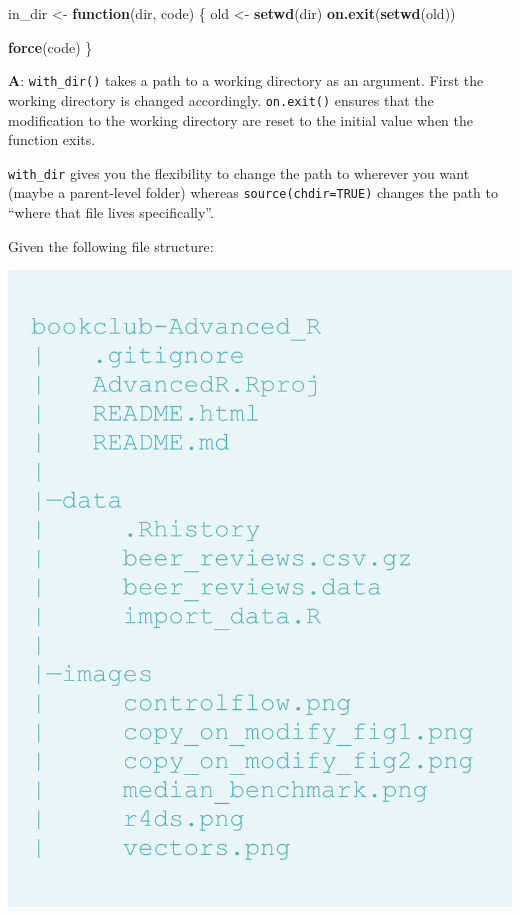 \documentclass[]{book}
\newenvironment{Shaded}{\begin{snugshade}}{\end{snugshade}}
\newcommand{\ControlFlowTok}[1]{\textcolor[rgb]{0.13,0.29,0.53}{\textbf{#1}}}
\newcommand{\KeywordTok}[1]{\textcolor[rgb]{0.13,0.29,0.53}{\textbf{#1}}}
\newcommand{\NormalTok}[1]{#1}
\newcommand{\StringTok}[1]{\textcolor[rgb]{0.31,0.60,0.02}{#1}}
\begin{document}
\begin{Shaded}
\begin{Highlighting}[]
\NormalTok{    in_dir <-}\StringTok{ }\ControlFlowTok{function}\NormalTok{(dir, code) \{}
\NormalTok{      old <-}\StringTok{ }\KeywordTok{setwd}\NormalTok{(dir)}
      \KeywordTok{on.exit}\NormalTok{(}\KeywordTok{setwd}\NormalTok{(old))}
      
      \KeywordTok{force}\NormalTok{(code)}
\NormalTok{    \}}
\end{Highlighting}
\end{Shaded}

\textbf{{A}}: \texttt{with\_dir()} takes a path to a working directory as an argument. First the working directory is changed accordingly. \texttt{on.exit()} ensures that the modification to the working directory are reset to the initial value when the function exits.

\texttt{with\_dir} gives you the flexibility to change the path to wherever you want (maybe a parent-level folder) whereas \texttt{source(chdir=TRUE)} changes the path to ``where that file lives specifically''.

Given the following file structure:

\begin{center}\includegraphics[width=12.11in]{images/filetree} \end{center}
\end{document}

